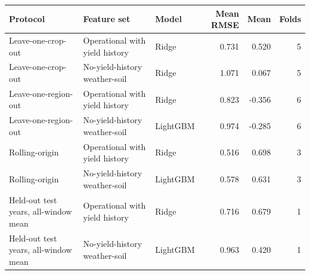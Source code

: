 \begin{tabular}{lllrrr}
\toprule
Protocol & Feature set & Model & Mean RMSE & Mean \Rsq{} & Folds \\
\midrule
Leave-one-crop-out & Operational with yield history & Ridge & 0.731 & 0.520 & 5 \\
Leave-one-crop-out & No-yield-history weather-soil & Ridge & 1.071 & 0.067 & 5 \\
Leave-one-region-out & Operational with yield history & Ridge & 0.823 & -0.356 & 6 \\
Leave-one-region-out & No-yield-history weather-soil & LightGBM & 0.974 & -0.285 & 6 \\
Rolling-origin & Operational with yield history & Ridge & 0.516 & 0.698 & 3 \\
Rolling-origin & No-yield-history weather-soil & LightGBM & 0.578 & 0.631 & 3 \\
Held-out test years, all-window mean & Operational with yield history & Ridge & 0.716 & 0.679 & 1 \\
Held-out test years, all-window mean & No-yield-history weather-soil & LightGBM & 0.963 & 0.420 & 1 \\
\bottomrule
\end{tabular}
